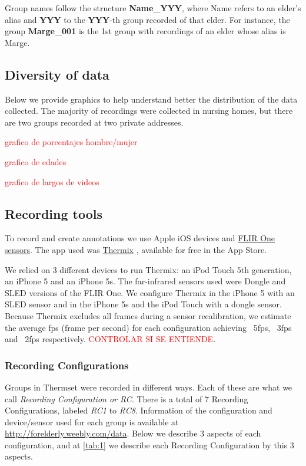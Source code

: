 \documentclass[oneside, twocolumn]{article}
\newcommand\myworries[1]{\textcolor{red}{#1}}
\begin{document}
Group names follow the structure \textbf{Name\_YYY}, where Name refers to an elder's alias and \textbf{YYY} to the \textbf{YYY}-th group recorded of that elder. For instance, the group \textbf{Marge\_001} is the 1st group with recordings of an elder whose alias is Marge.

\subsection{Diversity of data}
Below we provide graphics to help understand better the distribution of the data collected. The majority of recordings were collected in nursing homes, but there are two groups recorded at two private addresses.

\myworries{grafico de porcentajes hombre/mujer}

\myworries{grafico de edades}

\myworries{grafico de largos de videos}

\subsection{Recording tools}
To record and create annotations we use Apple iOS devices and \href{http://www.flir.com/flirone/ios/}{FLIR One sensors}. The app used was \href{http://appstore.com/thermixforflirone}{Thermix}\cite{thermix} , available for free in the App Store.

We relied on 3 different devices to run Thermix: an iPod Touch 5th generation,
an iPhone 5 and an iPhone 5s. The far-infrared sensors used were Dongle and SLED versions of the FLIR One.
We configure Thermix in the iPhone 5 with an SLED sensor and in the iPhone 5s and the
iPod Touch with a dongle sensor\cite{sdk_flir_dongle}\cite{sdk_flir_sled}. Because Thermix excludes all frames during a sensor recalibration, we estimate the
average fps (frame per second) for each configuration achieving ~5fps, ~3fps and ~2fps respectively.
\myworries{CONTROLAR SI SE ENTIENDE}.

\subsubsection{Recording Configurations}
Groups in Thermset were recorded in different ways. Each of these are what we call \textit{Recording Configuration or RC}. There is a total of 7 Recording Configurations, labeled \textit{RC1} to \textit{RC8}. Information of the configuration and device/sensor used for each group is available at \url{http://forelderly.weebly.com/data}.  Below we describe 3 aspects of each configuration, and at \autoref{tab:1} we describe each Recording Configuration by this 3 aspects.
\end{document}
